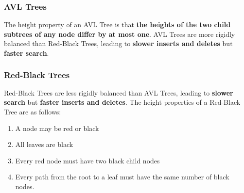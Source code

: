 \documentclass{article}
\begin{document}
\subsubsection{AVL Trees}
The height property of an AVL Tree is that {\bf the heights of the two child subtrees of any node differ by at most one}. AVL Trees are more rigidly balanced than Red-Black Trees, leading to {\bf slower inserts and deletes} but {\bf faster search}.

%

\subsubsection{Red-Black Trees}
Red-Black Trees are less rigidly balanced than AVL Trees, leading to {\bf slower search} but {\bf faster inserts and deletes}. The height properties of a Red-Black Tree are as follows:
\begin{enumerate}
	\item A node may be red or black
	\item All leaves are black
	\item Every red node must have two black child nodes
	\item Every path from the root to a leaf must have the same number of black nodes.
\end{enumerate}
\end{document}
